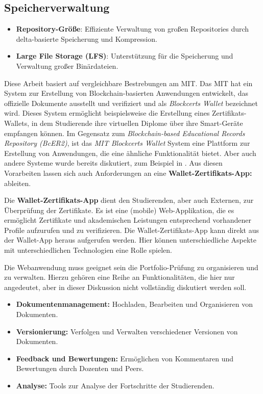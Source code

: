 \documentclass[conference]{IEEEtran}
\begin{document}
\begin{itemize}
    \subsection{Speicherverwaltung}
\begin{itemize}
    \item \textbf{Repository-Größe}: Effiziente Verwaltung von großen Repositories durch delta-basierte Speicherung und Kompression.
     \item \textbf{Large File Storage (LFS)}: Unterstützung für die Speicherung und Verwaltung großer Binärdateien.
    \end{itemize}

\end{itemize}

Diese Arbeit basiert auf vergleichbare Bestrebungen am MIT. Das MIT hat ein System zur Erstellung von Blockchain-basierten Anwendungen entwickelt, das offizielle Dokumente ausstellt und verifiziert und als \textit{Blockcerts Wallet} bezeichnet wird. Dieses System ermöglicht beispielsweise die Erstellung eines Zertifikats-Wallets, in dem Studierende ihre virtuellen Diplome über ihre Smart-Geräte empfangen können. Im Gegensatz zum \textit{Blockchain-based Educational Records Repository (BcER2)}, ist das \textit{MIT Blockcerts Wallet} System eine Plattform zur Erstellung von Anwendungen, die eine ähnliche Funktionalität bietet. Aber auch andere Systeme wurde bereits diskutiert, zum Beispiel in \cite{alammary2019blockchain}.
Aus diesen Vorarbeiten lassen sich auch Anforderungen an eine \textbf{Wallet-Zertifikats-App:} ableiten.

Die \textbf{Wallet-Zertifikats-App} dient den Studierenden, aber auch Externen, zur Überprüfung der Zertifikate. Es ist eine (mobile) Web-Applikation, die es ermöglicht Zertifikate und akademischen Leistungen entsprechend vorhandener Profile aufzurufen und zu verifizieren. Die Wallet-Zertifikats-App kann direkt aus der Wallet-App heraus aufgerufen werden. Hier können unterschiedliche Aspekte mit unterschiedlichen Technologien eine Rolle spielen. 

Die Webanwendung muss geeignet sein die Portfolio-Prüfung zu organisieren und zu verwalten. Hierzu gehören eine Reihe an Funktionalitäten, die hier nur angedeutet, aber in dieser Diskussion nicht vollständig diskutiert werden soll. 
\begin{itemize}
    \item \textbf{Dokumentenmanagement:} Hochladen, Bearbeiten und Organisieren von Dokumenten.
    \item \textbf{Versionierung:} Verfolgen und Verwalten verschiedener Versionen von Dokumenten.
    \item \textbf{Feedback und Bewertungen:} Ermöglichen von Kommentaren und Bewertungen durch Dozenten und Peers.
    \item \textbf{Analyse:} Tools zur Analyse der Fortschritte der Studierenden.
\end{itemize}
\end{document}
